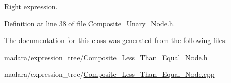 Right expression. 



Definition at line 38 of file Composite\_\-Unary\_\-Node.h.



The documentation for this class was generated from the following files:\begin{DoxyCompactItemize}
\item 
madara/expression\_\-tree/\hyperlink{Composite__Less__Than__Equal__Node_8h}{Composite\_\-Less\_\-Than\_\-Equal\_\-Node.h}\item 
madara/expression\_\-tree/\hyperlink{Composite__Less__Than__Equal__Node_8cpp}{Composite\_\-Less\_\-Than\_\-Equal\_\-Node.cpp}\end{DoxyCompactItemize}
